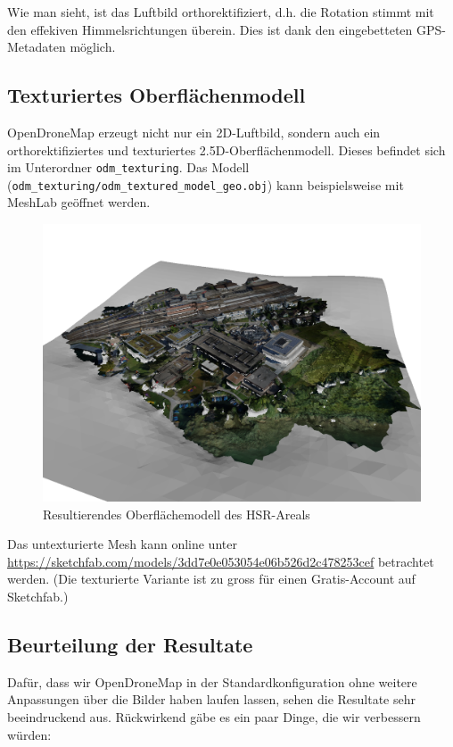\noindent Wie man sieht, ist das Luftbild orthorektifiziert, d.h. die Rotation
stimmt mit den effekiven Himmelsrichtungen überein. Dies ist dank den
eingebetteten GPS-Metadaten möglich.

\subsection{Texturiertes Oberflächenmodell}

OpenDroneMap erzeugt nicht nur ein 2D-Luftbild, sondern auch ein
orthorektifiziertes und texturiertes 2.5D-Oberflächenmodell. Dieses befindet
sich im Unterordner \texttt{odm\_texturing}. Das Modell
(\texttt{odm\_tex\-tu\-ring/\-odm\_textured\_model\_geo.obj}) kann
beispielsweise mit MeshLab geöffnet werden.

\begin{figure}[H]
	\centering
	\includegraphics[width=\textwidth]{images/odm_mesh}
	\caption{Resultierendes Oberflächemodell des HSR-Areals}
	\label{img:odm_mesh}
\end{figure}

\noindent Das untexturierte Mesh kann online unter
\url{https://sketchfab.com/models/3dd7e0e053054e06b526d2c478253cef} betrachtet
werden. (Die texturierte Variante ist zu gross für einen Gratis-Account auf
Sketchfab.)

\subsection{Beurteilung der Resultate}

Dafür, dass wir OpenDroneMap in der Standardkonfiguration ohne weitere
Anpassungen über die Bilder haben laufen lassen, sehen die Resultate sehr
beeindruckend aus. Rückwirkend gäbe es ein paar Dinge, die wir verbessern
würden:

